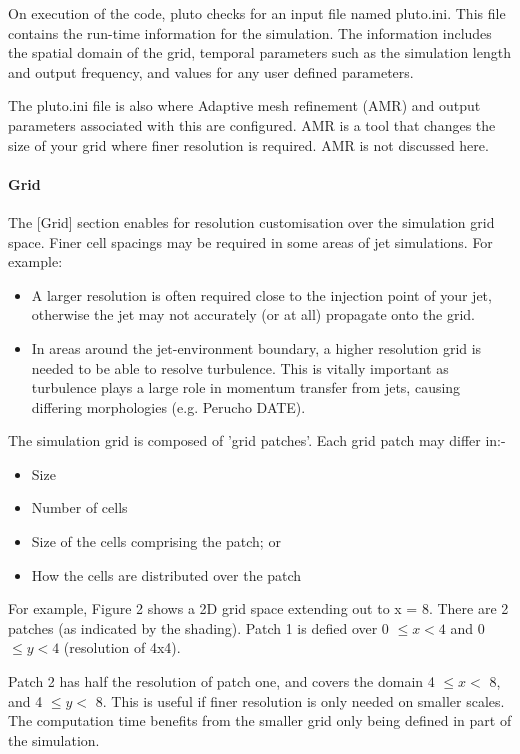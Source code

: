 \documentclass[12pt]{article}
\begin{document}
On execution of the code, pluto checks for an input file named pluto.ini. This file contains the run-time information for the simulation. The information includes the spatial domain of the grid, temporal parameters such as the simulation length and output frequency, and values for any user defined parameters.

The pluto.ini file is also where Adaptive mesh refinement (AMR) and output parameters associated with this are configured. AMR is a tool that changes the size of your grid where finer resolution is required. AMR is not discussed here.

\paragraph{Grid}\mbox{}
\newline
 The [Grid] section enables for resolution customisation over the simulation grid space. Finer cell spacings may be required in some areas of jet simulations. For example:
 
 \begin{itemize}
  \item A larger resolution is often required close to the injection point of your jet, otherwise the jet may not accurately (or at all) propagate onto the grid.
  
  
 \item In areas around the jet-environment boundary, a higher resolution grid is needed to be able to resolve turbulence. This is vitally important as turbulence plays a large role in momentum transfer from jets, causing differing morphologies (e.g. Perucho DATE). 
 \end{itemize}
The simulation grid is composed of 'grid patches'. Each grid patch may differ in:- 
\begin{itemize}
\item Size
\item Number of cells
\item Size of the cells comprising the patch; or
\item How the cells are distributed over the patch
\end{itemize}For example, Figure 2  shows a 2D grid space extending out to x = 8.  There are 2 patches (as indicated by the shading). Patch 1 is defied over 0 $\leq x < 4$ and 0 $\leq y < 4$  (resolution of 4x4).

Patch 2 has half the resolution of patch one, and covers the domain 4 $\leq x <$ 8, and 4 $\leq y <$ 8. 
This is useful if finer resolution is only needed on smaller scales. The computation time benefits from the smaller grid only being defined in part of the simulation.
\end{document}
